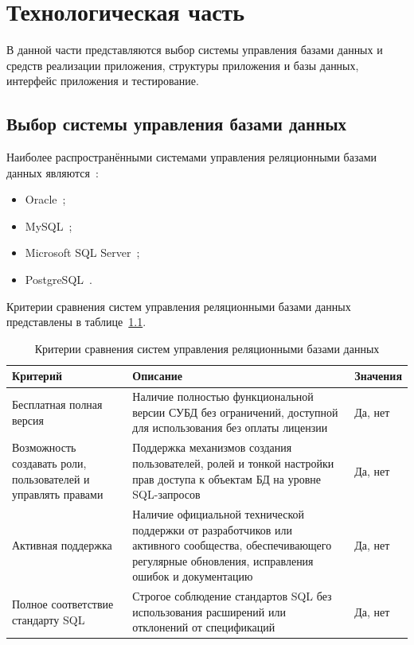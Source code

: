 \chapter{Технологическая часть}

В данной части представляются выбор системы управления базами данных и средств реализации приложения, структуры приложения и базы данных, интерфейс приложения и тестирование.

\section{Выбор системы управления базами данных}

Наиболее распространёнными системами управления реляционными базами данных являются~\cite{lit11}:
\begin{itemize}[label=--]
	\item Oracle~\cite{lit12};
	\item MySQL~\cite{lit13};
	\item Microsoft SQL Server~\cite{lit14};
	\item PostgreSQL~\cite{lit15}.
\end{itemize}

Критерии сравнения систем управления реляционными базами данных представлены в таблице~\ref{tbl:subd-criteria}.

\begin{table}[h]
	\centering
	\caption{Критерии сравнения систем управления реляционными базами данных}
	\label{tbl:subd-criteria}
	\begin{tabularx}{\textwidth}{|p{3.5cm}|X|p{2.1cm}|}
		\hline
		\textbf{Критерий} & \textbf{Описание} & \textbf{Значения} \\
		\hline
		Бесплатная полная версия & Наличие полностью функциональной версии СУБД без ограничений, доступной для использования без оплаты лицензии & Да, нет \\
		\hline
		Возможность создавать роли, пользователей и управлять правами & Поддержка механизмов создания пользователей, ролей и тонкой настройки прав доступа к объектам БД на уровне SQL-запросов & Да, нет \\
		\hline
		Активная поддержка & Наличие официальной технической поддержки от разработчиков или активного сообщества, обеспечивающего регулярные обновления, исправления ошибок и документацию & Да, нет \\
		\hline
		Полное соответствие стандарту SQL & Строгое соблюдение стандартов SQL без использования расширений или отклонений от спецификаций & Да, нет \\
		\hline
	\end{tabularx}
\end{table}

